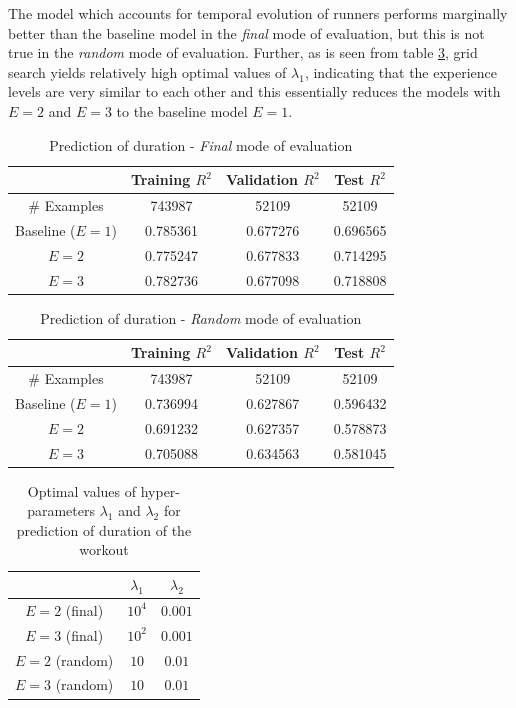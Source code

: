 \documentclass{acm_proc_article-sp}
\begin{document}
The model which accounts for temporal evolution of runners performs marginally better than the baseline model in the \emph{final} mode of evaluation, but this is not true in the \emph{random} mode of evaluation. Further, as is seen from table \ref{tableDurationHyperparams}, grid search yields relatively high optimal values of $\lambda_1$, indicating that the experience levels are very similar to each other and this essentially reduces the models with $E = 2$ and $E = 3$ to the baseline model $E = 1$.

\begin{table}[H]
\centering
\begin{tabular}{|c|c|c|c|} \hline
& Training $R^2$ & Validation $R^2$ & Test $R^2$ \\ \hline
\# Examples & 743987 & 52109 & 52109 \\ \hline
Baseline ($E = 1$) & 0.785361 & 0.677276 & 0.696565 \\ \hline
$E = 2$ & 0.775247 & 0.677833 & 0.714295 \\ \hline
$E = 3$ & 0.782736 & 0.677098 & 0.718808 \\ \hline
\end{tabular}
\caption{Prediction of duration - \emph{Final} mode of evaluation }
\label{tableDurationFinal}
\end{table}

\begin{table}[H]
\centering
\begin{tabular}{|c|c|c|c|} \hline
& Training $R^2$ & Validation $R^2$ & Test $R^2$ \\ \hline
\# Examples & 743987 & 52109 & 52109  \\ \hline
Baseline ($E = 1$) & 0.736994 & 0.627867 & 0.596432 \\ \hline
$E = 2$ & 0.691232 & 0.627357 & 0.578873 \\ \hline
$E = 3$ & 0.705088 & 0.634563 & 0.581045 \\ \hline
\end{tabular}
\caption{Prediction of duration - \emph{Random} mode of evaluation }
\label{tableDurationRandom}
\end{table}

\begin{table}[H]
\centering
\begin{tabular}{|c|c|c|} \hline
& $\lambda_1$ & $\lambda_2$ \\ \hline
$E = 2$ (final) & $10^4$ & $0.001$ \\ \hline
$E = 3$ (final) & $10^2$ & $0.001$ \\ \hline
$E = 2$ (random) & $10$ & $0.01$ \\ \hline
$E = 3$ (random) & $10$ & $0.01$ \\ \hline
\end{tabular}
\caption{Optimal values of hyper-parameters $\lambda_1$ and $\lambda_2$ for prediction of duration of the workout}
\label{tableDurationHyperparams}
\end{table}
\end{document}

